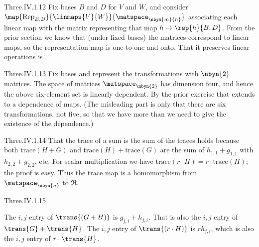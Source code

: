 \begin{ans}{Three.IV.1.12}
      Fix bases \( B \) and \( D \) for \( V \) and \( W \), and consider
      \( \map{\mbox{Rep}_{B,D}}{\linmaps{V}{W}}{\matspace_{\nbym{m}{n}}} \)
      associating each linear map with the matrix representing that map
      $h\mapsto \rep{h}{B,D}$.
      From the prior section we know that (under fixed bases)
      the matrices correspond to linear maps,
      so the representation map is one-to-one and onto.
      That it preserves linear operations is
      .
    
\end{ans}
\begin{ans}{Three.IV.1.13}
      Fix bases and represent the transformations with
      \( \nbyn{2} \) matrices.
      The space of matrices \( \matspace_{\nbyn{2}} \) has dimension four,
      and hence the above six-element set is linearly dependent.
      By the prior exercise that extends to a dependence of maps.
      (The misleading part is only that there are six transformations, not
      five, so that we have more than we need to give the existence of the
      dependence.)
    
\end{ans}
\begin{ans}{Three.IV.1.14}
      That the trace of a sum is the sum of the traces holds
      because both \( \text{trace}(H+G) \) and
      \( \text{trace}(H)+\text{trace}(G) \) are the sum of
      \( h_{1,1}+g_{1,1} \) with \( h_{2,2}+g_{2,2} \), etc.
      For scalar multiplication we have
      \( \mbox{trace}(r\cdot H)=r\cdot\mbox{trace}(H) \); the proof is easy.
      Thus the trace map is a homomorphism from $\matspace_{\nbyn{n}}$ to
      $\Re$.
    
\end{ans}
\begin{ans}{Three.IV.1.15}
      \begin{exparts}
        \partsitem The \( i,j \) entry of \( \trans{(G+H)} \) is
          \( g_{j,i}+h_{j,i} \).
          That is also the \( i,j \) entry of \( \trans{G}+\trans{H} \).
        \partsitem The \( i,j \) entry of \( \trans{(r\cdot H)} \) is
          \( rh_{j,i} \),
          which is also the \( i,j \) entry of \( r\cdot\trans{H} \).
      \end{exparts}
   
\end{ans}

